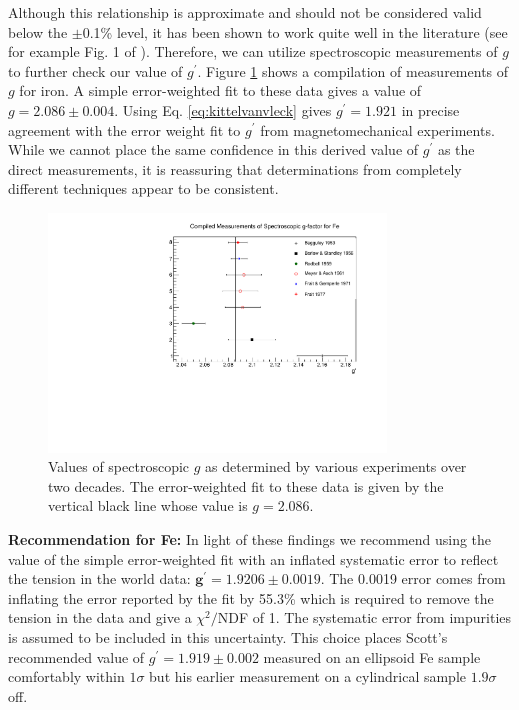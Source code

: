 \documentclass[preprint,12pt]{elsarticle}
\begin{document}
Although this relationship is approximate and should not be considered valid below the $\pm$0.1\% level, it has been shown to work quite well in the literature (see for example Fig. 1 of \cite{Meyer1961}). Therefore, we can utilize spectroscopic measurements of $g$ to further check our value of $g^{\prime}$. Figure \ref{fig:gfactor_world_data_Fe} shows a compilation of measurements of $g$ for iron. A simple error-weighted fit to these data gives a value of $g=2.086\pm0.004$. Using Eq. \ref{eq:kittelvanvleck} gives $g^{\prime}=1.921$ in precise agreement with the error weight fit to $g^{\prime}$ from magnetomechanical experiments. While we cannot place the same confidence in this derived value of  $g^{\prime}$ as the direct measurements, it is reassuring that determinations from completely different techniques appear to be consistent.
\begin{figure}[h]
\centering
\includegraphics[width=0.8\textwidth]{gfactor_world_data_Fe.pdf}
\caption{Values of spectroscopic $g$ as determined by various experiments over two decades. The error-weighted fit to these data is given by the vertical black line whose value is $g=2.086$.}
\label{fig:gfactor_world_data_Fe}
\end{figure}

{\bf Recommendation for Fe:} In light of these findings we recommend using the value of the simple error-weighted fit with an inflated systematic error to reflect the tension in the world data: $\bm{ g^{\prime}=1.9206\pm0.0019}$. The 0.0019 error comes from inflating the error reported by the fit by 55.3\% which is required to remove the tension in the data and give a $\chi^2/$NDF of 1. The systematic error from impurities is assumed to be included in this uncertainty. This choice places Scott's recommended value of $g^{\prime}=1.919\pm0.002$ measured on an ellipsoid Fe sample \cite{Scott1962} comfortably within $1\sigma$ but his earlier measurement on a cylindrical sample $1.9\sigma$ off. 
\end{document}

